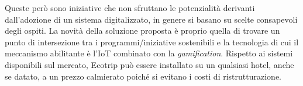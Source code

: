 Queste però sono iniziative che non sfruttano le potenzialità derivanti dall'adozione di un sistema digitalizzato, in genere si basano su scelte consapevoli degli ospiti. La novità della soluzione proposta è proprio quella di trovare un punto di intersezione tra i programmi/iniziative sostenibili e la tecnologia di cui il meccanismo abilitante è l'IoT combinato con la \textit{gamification}. Rispetto ai sistemi disponibili sul mercato, Ecotrip può essere installato su un qualsiasi hotel, anche se datato, a un prezzo calmierato poiché si evitano i costi di ristrutturazione.

\newpage